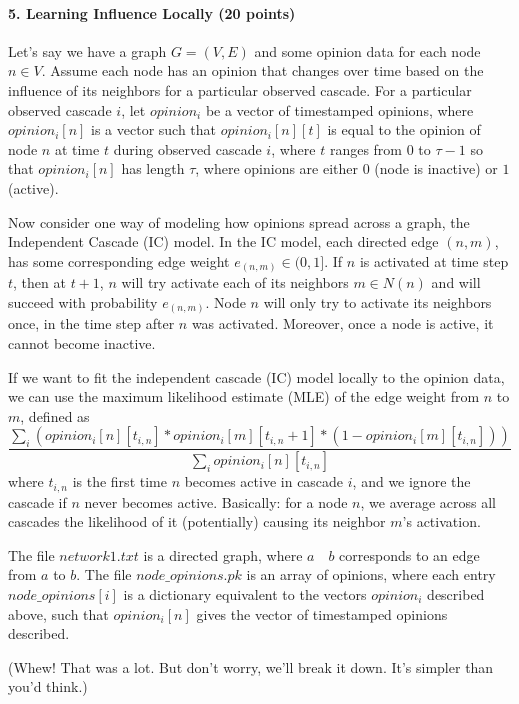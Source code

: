 \documentclass[11pt]{article}
\begin{document}
\paragraph{5. Learning Influence Locally (20 points)}
\par Let's say we have a graph $G = (V,E)$ and some opinion data for each node $n \in V$. Assume each node has an opinion that changes over time based on the influence of its neighbors for a particular observed cascade. For a particular observed cascade $i$, let $opinion_i$ be a vector of timestamped opinions, where $opinion_i[n]$ is a vector such that $opinion_i[n][t]$ is equal to the opinion of node $n$ at time $t$ during observed cascade $i$, where $t$ ranges from $0$ to $\tau - 1$ so that $opinion_i[n]$ has length $\tau$, where opinions are either $0$ (node is inactive) or $1$ (active).
\par Now consider one way of modeling how opinions spread across a graph, the Independent Cascade (IC) model. In the IC model, each directed edge $(n, m)$, has some corresponding edge weight $e_{(n,m)} \in (0,1]$. If $n$ is activated at time step $t$, then at $t+1$, $n$ will try activate each of its neighbors $m \in N(n)$ and will succeed with probability $e_{(n,m)}$. Node $n$ will only try to activate its neighbors once, in the time step after $n$ was activated. Moreover, once a node is active, it cannot become inactive.
\par If we want to fit the independent cascade (IC) model locally to the opinion data, we can use the maximum likelihood estimate (MLE) of the edge weight from $n$ to $m$, defined as $$\frac{\sum_i (opinion_i[n][t_{i,n}] * opinion_i[m][t_{i,n} +1] * (1 - opinion_i[m][t_{i,n}]))}{\sum_i opinion_i[n][t_{i,n}]}$$ where $t_{i,n}$ is the first time $n$ becomes active in cascade $i$, and we ignore the cascade if $n$ never becomes active. Basically: for a node $n$, we average across all cascades the likelihood of it (potentially) causing its neighbor $m$'s activation.
\par The file $network1.txt$ is a directed graph, where $a \quad b$ corresponds to an edge from $a$ to $b$. The file $node\_opinions.pk$ is an array of opinions, where each entry $node\_opinions[i]$ is a dictionary equivalent to the vectors $opinion_i$ described above, such that $opinion_i[n]$ gives the vector of timestamped opinions described.
\par (Whew! That was a lot. But don't worry, we'll break it down. It's simpler than you'd think.)
\end{document}
